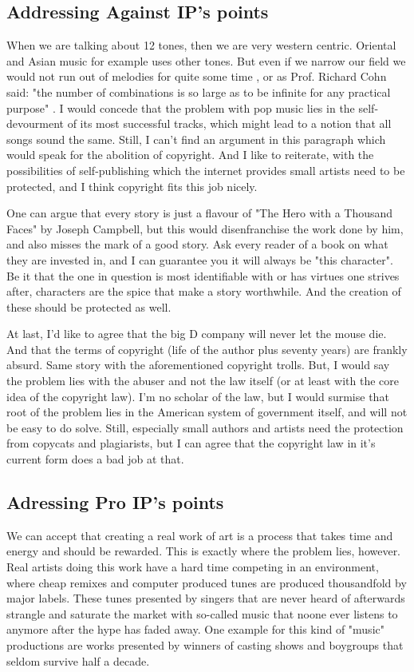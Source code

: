 \documentclass[a4paper]{report}
\begin{document}
\subsection{Addressing Against IP's points}

When we are talking about 12 tones, then we are very western centric. Oriental and Asian music for example uses other tones. But even if we narrow our field we would not run out of melodies for quite some time \parencite{Stevens2012}, or as Prof. Richard Cohn said: "the number of combinations is so large as to be infinite for any practical purpose" \parencite{Niller2015}.
I would concede that the problem with pop music lies in the self-devourment of its most successful tracks, which might lead to a notion that all songs sound the same.
Still, I can't find an argument in this paragraph which would speak for the abolition of copyright. And I like to reiterate, with the possibilities of self-publishing which the internet provides small artists need to be protected, and I think copyright fits this job nicely.

One can argue that every story is just a flavour of "The Hero with a Thousand Faces" by Joseph Campbell, but this would disenfranchise the work done by him, and also misses the mark of a good story. Ask every reader of a book on what they are invested in, and I can guarantee you it will always be "this character". Be it that the one in question is most identifiable with or has virtues one strives after, characters are the spice that make a story worthwhile. And the creation of these should be protected as well.

At last, I'd like to agree that the big D company will never let the mouse die. And that the terms of copyright (life of the author plus seventy years) are frankly absurd. Same story with the aforementioned copyright trolls. But, I would say the problem lies with the abuser and not the law itself (or at least with the core idea of the copyright law). I'm no scholar of the law, but I would surmise that root of the problem lies in the American system of government itself, and will not be easy to do solve.
Still, especially small authors and artists need the protection from copycats and plagiarists, but I can agree that the copyright law in it's current form does a bad job at that.

\subsection{Adressing Pro IP's points}
We can accept that  creating a real work of art is a process that takes time and energy and should be rewarded. This is exactly where the problem lies, however. Real artists doing this work have a hard time competing in an environment, where cheap remixes and computer produced tunes are produced thousandfold by major labels. These tunes presented by singers that are never heard of afterwards strangle and saturate the market with so-called music that noone ever listens to anymore after the hype has faded away. One example for this kind of "music" productions are works presented by winners of casting shows and boygroups that seldom survive half a decade.
\end{document}
